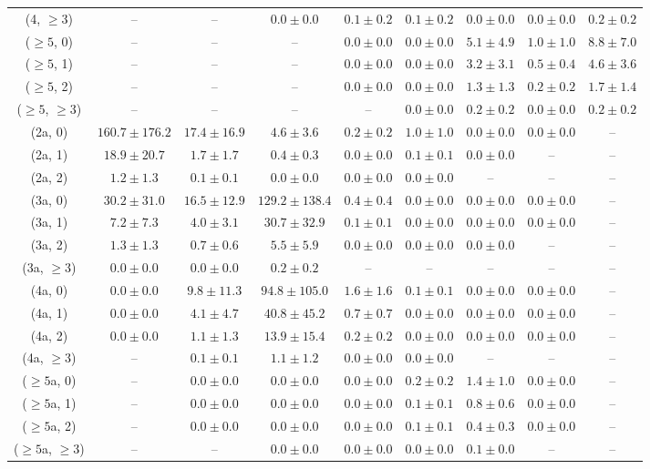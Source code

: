 \begin{table}[h!]
{\begin{tabular}{ccccccccc}
	(4, $\ge3$) & -- & -- & $0.0\pm 0.0$ & $0.1\pm 0.2$ & $0.1\pm 0.2$ & $0.0\pm 0.0$ & $0.0\pm 0.0$ & $0.2\pm 0.2$ \\[0.5ex] 
	($\ge5$, 0) & -- & -- & -- & $0.0\pm 0.0$ & $0.0\pm 0.0$ & $5.1\pm 4.9$ & $1.0\pm 1.0$ & $8.8\pm 7.0$ \\[0.5ex] 
	($\ge5$, 1) & -- & -- & -- & $0.0\pm 0.0$ & $0.0\pm 0.0$ & $3.2\pm 3.1$ & $0.5\pm 0.4$ & $4.6\pm 3.6$ \\[0.5ex] 
	($\ge5$, 2) & -- & -- & -- & $0.0\pm 0.0$ & $0.0\pm 0.0$ & $1.3\pm 1.3$ & $0.2\pm 0.2$ & $1.7\pm 1.4$ \\[0.5ex] 
	($\ge5$, $\ge3$) & -- & -- & -- & -- & $0.0\pm 0.0$ & $0.2\pm 0.2$ & $0.0\pm 0.0$ & $0.2\pm 0.2$ \\[0.5ex] 
	(2a, 0) & $160.7\pm 176.2$ & $17.4\pm 16.9$ & $4.6\pm 3.6$ & $0.2\pm 0.2$ & $1.0\pm 1.0$ & $0.0\pm 0.0$ & $0.0\pm 0.0$ & -- \\[0.5ex] 
	(2a, 1) & $18.9\pm 20.7$ & $1.7\pm 1.7$ & $0.4\pm 0.3$ & $0.0\pm 0.0$ & $0.1\pm 0.1$ & $0.0\pm 0.0$ & -- & -- \\[0.5ex] 
	(2a, 2) & $1.2\pm 1.3$ & $0.1\pm 0.1$ & $0.0\pm 0.0$ & $0.0\pm 0.0$ & $0.0\pm 0.0$ & -- & -- & -- \\[0.5ex] 
	(3a, 0) & $30.2\pm 31.0$ & $16.5\pm 12.9$ & $129.2\pm 138.4$ & $0.4\pm 0.4$ & $0.0\pm 0.0$ & $0.0\pm 0.0$ & $0.0\pm 0.0$ & -- \\[0.5ex] 
	(3a, 1) & $7.2\pm 7.3$ & $4.0\pm 3.1$ & $30.7\pm 32.9$ & $0.1\pm 0.1$ & $0.0\pm 0.0$ & $0.0\pm 0.0$ & $0.0\pm 0.0$ & -- \\[0.5ex] 
	(3a, 2) & $1.3\pm 1.3$ & $0.7\pm 0.6$ & $5.5\pm 5.9$ & $0.0\pm 0.0$ & $0.0\pm 0.0$ & $0.0\pm 0.0$ & -- & -- \\[0.5ex] 
	(3a, $\ge3$) & $0.0\pm 0.0$ & $0.0\pm 0.0$ & $0.2\pm 0.2$ & -- & -- & -- & -- & -- \\[0.5ex] 
	(4a, 0) & $0.0\pm 0.0$ & $9.8\pm 11.3$ & $94.8\pm 105.0$ & $1.6\pm 1.6$ & $0.1\pm 0.1$ & $0.0\pm 0.0$ & $0.0\pm 0.0$ & -- \\[0.5ex] 
	(4a, 1) & $0.0\pm 0.0$ & $4.1\pm 4.7$ & $40.8\pm 45.2$ & $0.7\pm 0.7$ & $0.0\pm 0.0$ & $0.0\pm 0.0$ & $0.0\pm 0.0$ & -- \\[0.5ex] 
	(4a, 2) & $0.0\pm 0.0$ & $1.1\pm 1.3$ & $13.9\pm 15.4$ & $0.2\pm 0.2$ & $0.0\pm 0.0$ & $0.0\pm 0.0$ & $0.0\pm 0.0$ & -- \\[0.5ex] 
	(4a, $\ge3$) & -- & $0.1\pm 0.1$ & $1.1\pm 1.2$ & $0.0\pm 0.0$ & $0.0\pm 0.0$ & -- & -- & -- \\[0.5ex] 
	($\ge5$a, 0) & -- & $0.0\pm 0.0$ & $0.0\pm 0.0$ & $0.0\pm 0.0$ & $0.2\pm 0.2$ & $1.4\pm 1.0$ & $0.0\pm 0.0$ & -- \\[0.5ex] 
	($\ge5$a, 1) & -- & $0.0\pm 0.0$ & $0.0\pm 0.0$ & $0.0\pm 0.0$ & $0.1\pm 0.1$ & $0.8\pm 0.6$ & $0.0\pm 0.0$ & -- \\[0.5ex] 
	($\ge5$a, 2) & -- & $0.0\pm 0.0$ & $0.0\pm 0.0$ & $0.0\pm 0.0$ & $0.1\pm 0.1$ & $0.4\pm 0.3$ & $0.0\pm 0.0$ & -- \\[0.5ex] 
	($\ge5$a, $\ge3$) & -- & -- & $0.0\pm 0.0$ & $0.0\pm 0.0$ & $0.0\pm 0.0$ & $0.1\pm 0.0$ & -- & -- \\[0.5ex] 
	\hline
	\hline
\end{tabular}}
\end{table}
